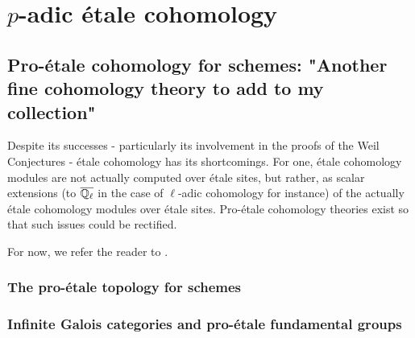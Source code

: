 \chapter{\texorpdfstring{$p$}{}-adic \'etale cohomology}
    \begin{abstract}
        
    \end{abstract}
    
    \minitoc
    
    \section{Pro-\'etale cohomology for schemes: "Another fine cohomology theory to add to my collection"}
        Despite its successes - particularly its involvement in the proofs of the Weil Conjectures - \'etale cohomology has its shortcomings. For one, \'etale cohomology modules are not actually computed over \'etale sites, but rather, as scalar extensions (to $\overline{\mathbb{Q}_{\ell}}$ in the case of $\ell$-adic cohomology for instance) of the actually \'etale cohomology modules over \'etale sites. Pro-\'etale cohomology theories exist so that such issues could be rectified. 
        
        \begin{remark}
            For now, we refer the reader to \cite[Definition 4.1.1 and Remark 4.1.3]{bhatt_scholze_2014_pro_etale}.
        \end{remark}
        
        \subsection{The pro-\'etale topology for schemes}
        
        \subsection{Infinite Galois categories and pro-\'etale fundamental groups}
